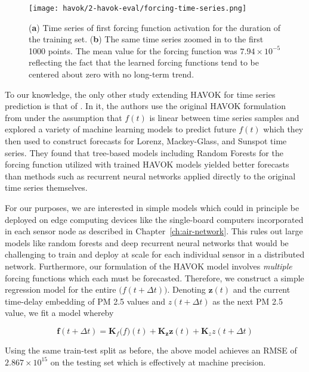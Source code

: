 \begin{figure}[h]
  \vspace{-1cm}
  \centering
  \texttt{[image: havok/2-havok-eval/forcing-time-series.png]}
  \caption{(\textbf{a}) Time series of first forcing function activation for the
    duration of the training set. (\textbf{b}) The same time series zoomed in to
    the first 1000 points. The mean value for the forcing function was $7.94\times
    10^{-5}$ reflecting the fact that the learned forcing functions tend to be
    centered about zero with no long-term trend.}
  \label{fig:pm-forcing-time-series}
\end{figure}


To our knowledge, the only other study extending HAVOK for time series
prediction is that of \cite{havok-ml}. In it, the authors use the original
HAVOK formulation from \cite{brunton-havok-orig} under the assumption that
$f(t)$ is linear between time series samples and explored a variety of machine
learning models to predict future $f(t)$ which they then used to construct
forecasts for Lorenz, Mackey-Glass, and Sunspot time series. They found that
tree-based models including Random Forests for the forcing function utilized
with trained HAVOK models yielded better forecasts than methods such
as recurrent neural networks applied directly to the original time series themselves.

For our purposes, we are interested in simple models which could in principle be
deployed on edge computing devices like the single-board computers incorporated
in each sensor node as described in Chapter~\ref{ch:air-network}. This rules out
large models like random forests and deep recurrent neural networks  that would
be challenging to train and deploy at scale for each individual sensor in a
distributed network. Furthermore, our formulation of the HAVOK model involves
\textit{multiple} forcing functions which each must be forecasted. Therefore, we
construct a simple regression model for the entire $\mathbf(f(t+\Delta t))$.
Denoting $\mathbf{z}(t)$ and the current time-delay embedding of PM 2.5 values
and $z(t+\Delta t)$ as the next PM 2.5 value, we fit a model whereby

\begin{equation}
  \mathbf{f}(t+\Delta t) = \mathbf{K}_f\mathbf(f)(t) + \mathbf{K}_{\mathbf{z}}\mathbf{z}(t) + \mathbf{K}_{z}z(t+\Delta t)
\end{equation}

Using the same train-test split as before, the above model achieves an RMSE of
$2.867\times 10^{15}$ on the testing set which is effectively at machine
precision. 



